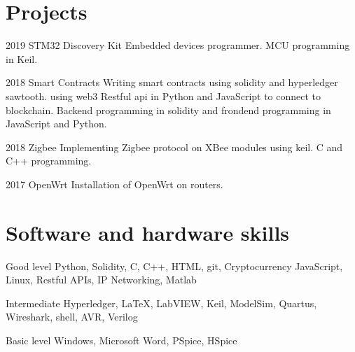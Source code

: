 \documentclass{tccv}
\begin{document}
\section{Projects}

\begin{yearlist}

\item{2019}
     {STM32 Discovery Kit}
     {Embedded devices programmer. MCU programming in Keil.}

\item{2018}
     {Smart Contracts}
     {Writing smart contracts using solidity and hyperledger sawtooth. using web3 Restful api in
     Python and JavaScript to connect to blockchain. Backend programming in solidity and frondend programming
     in JavaScript and Python.}

\item{2018}
     {Zigbee}
     {Implementing Zigbee protocol on XBee modules using keil. C and C++ programming.}

\item{2017}
     {OpenWrt}
     {Installation of OpenWrt on routers.}

\end{yearlist}

%

\section{Software and hardware skills}

\begin{factlist}

\item{Good level}
     {Python, Solidity, C, C++, HTML, git, Cryptocurrency
      JavaScript, Linux, Restful APIs, IP Networking, Matlab}

\item{Intermediate}
     {Hyperledger, \LaTeX, LabVIEW, Keil, ModelSim, Quartus,
     Wireshark, shell, AVR, Verilog}

\item{Basic level}
     {Windows, Microsoft Word, PSpice, HSpice}

\end{factlist}
\end{document}
